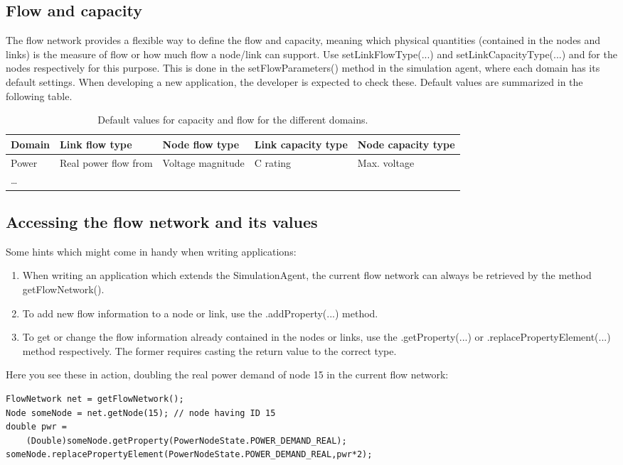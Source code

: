 \documentclass[11pt,fleqn]{book} %
\begin{document}
\subsection{Flow and capacity}
The flow network provides a flexible way to define the flow and capacity, meaning which physical quantities (contained in the nodes and links) is the measure of flow or how much flow a node/link can support. Use setLinkFlowType(...) and setLinkCapacityType(...) and for the nodes respectively for this purpose. This is done in the setFlowParameters() method in the simulation agent, where each domain has its default settings. When developing a new application, the developer is expected to check these. Default values are summarized in the following table.
\begin{table}[h]
	\centering
	\begin{tabular}{|l| p{2.5cm}| p{2.5cm}|l|l|}
	\hline
	\rowcolor{Gray}
	Domain & Link flow type & Node flow type & Link capacity type & Node capacity type\\
	\hline
	Power & Real power flow from & Voltage magnitude & C rating & Max. voltage\\
	\hline
	\dots &&&&\\
	\hline
	\end{tabular}
	\caption{Default values for capacity and flow for the different domains.}
	\label{table:flow_capacity}
\end{table}

\subsection{Accessing the flow network and its values}
Some hints which might come in handy when writing applications:
\begin{enumerate}
	\item When writing an application which extends the SimulationAgent, the current flow network can always be retrieved by the method getFlowNetwork().
	\item To add new flow information to a node or link, use the .addProperty(...) method.
	\item To get or change the flow information already contained in the nodes or links, use the .getProperty(...) or .replacePropertyElement(...) method respectively. The former requires casting the return value to the correct type.
\end{enumerate}

Here you see these in action, doubling the real power demand of node 15 in the current flow network:
\begin{lstlisting}[frame=single] 
FlowNetwork net = getFlowNetwork();
Node someNode = net.getNode(15); // node having ID 15
double pwr = 
	(Double)someNode.getProperty(PowerNodeState.POWER_DEMAND_REAL);
someNode.replacePropertyElement(PowerNodeState.POWER_DEMAND_REAL,pwr*2);
\end{lstlisting}
\end{document}
